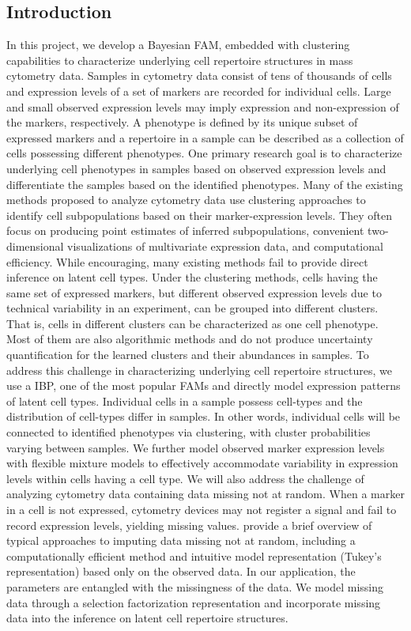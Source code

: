\documentclass[12pt,]{article}
\begin{document}
\subsection{Introduction}

In this project, we develop a Bayesian FAM, embedded with clustering
capabilities to characterize underlying cell repertoire structures in mass
cytometry data.  Samples in cytometry data consist of tens of thousands of
cells and expression levels of a set of markers are recorded for individual
cells. Large and small observed expression levels may imply expression and
non-expression of the markers, respectively.  A phenotype is defined by its
unique subset of expressed markers and a repertoire in a sample can be
described as a collection of cells possessing different phenotypes.  One
primary research goal is to characterize underlying cell phenotypes in samples
based on observed expression levels and differentiate the samples based on the
identified phenotypes.  Many of the existing methods proposed to analyze
cytometry data use clustering approaches to identify cell subpopulations based
on their marker-expression levels.  They often focus on producing point
estimates of inferred subpopulations, convenient two-dimensional visualizations
of multivariate expression data, and computational efficiency.  While
encouraging, many existing methods fail to provide direct inference on latent
cell types.  Under the clustering methods, cells having the same set of
expressed markers, but different observed expression levels due to technical
variability in an experiment, can be grouped into different clusters.  That is,
cells in different clusters can be characterized as one cell phenotype.  Most
of them are also algorithmic methods and do not produce uncertainty
quantification for the learned clusters and their abundances in samples.  To
address this challenge in characterizing underlying cell repertoire structures,
we use a IBP, one of the most popular FAMs and directly model expression
patterns of latent cell types.  Individual cells in a sample possess cell-types
and the distribution of cell-types differ in samples. In other words, individual
cells will be connected to identified phenotypes via clustering, with
cluster probabilities varying between samples.  We further model observed
marker expression levels with flexible mixture models to effectively
accommodate variability in expression levels within cells having a cell type.
We will also address the challenge of analyzing cytometry data containing data
missing not at random.  When a marker in a cell is not expressed, cytometry
devices may not register a signal and fail to record expression levels,
yielding missing values.  \cite{franks2016non} provide a brief overview of
typical approaches to imputing data missing not at random, including a
computationally efficient method and intuitive model representation (Tukey's
representation) based only on the observed data.  In our application, the
parameters are entangled with the missingness of the data.  We model missing
data through a selection factorization representation
\citep{rubin1974characterizing} and incorporate missing data into the inference on latent cell repertoire structures.
\end{document}
